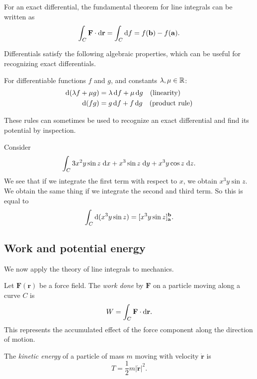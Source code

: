 \documentclass[a4paper]{article}
\begin{document}
\begin{rmk}
  For an exact differential, the fundamental theorem for line integrals can be written as
  \[
    \int_C \mathbf{F} \cdot \mathrm{d}\mathbf{r} = \int_C \mathrm{d} f = f(\mathbf{b}) - f(\mathbf{a}).
  \]
\end{rmk}

Differentials satisfy the following algebraic properties, which can be useful for recognizing exact differentials.

\begin{prop}
  For differentiable functions $f$ and $g$, and constants $\lambda, \mu \in \mathbb{R}$:
  \begin{align*}
    \mathrm{d}(\lambda f + \mu g) &= \lambda \, \mathrm{d} f + \mu \, \mathrm{d} g \quad \text{(linearity)}\\
    \mathrm{d}(fg) &= g \, \mathrm{d} f + f \, \mathrm{d} g \quad \text{(product rule)}
  \end{align*}
\end{prop}

These rules can sometimes be used to recognize an exact differential and find its potential by inspection.

\begin{eg}
  Consider
  \[
    \int_C 3x^2 y\sin z\;\mathrm{d} x + x^3 \sin z \;\mathrm{d} y + x^3 y\cos z\;\mathrm{d} z.
  \]
  We see that if we integrate the first term with respect to $x$, we obtain $x^3 y\sin z$. We obtain the same thing if we integrate the second and third term. So this is equal to
  \[
    \int_C \mathrm{d} (x^3 y \sin z) = [x^3 y\sin z]^{\mathbf{b}}_{\mathbf{a}}.
  \]
\end{eg}

\subsection{Work and potential energy}
We now apply the theory of line integrals to mechanics.

\begin{defi}[Work]
  Let $\mathbf{F}(\mathbf{r})$ be a force field. The \emph{work done} by $\mathbf{F}$ on a particle moving along a curve $C$ is
  \[
    W = \int_C \mathbf{F} \cdot \mathrm{d}\mathbf{r}.
  \]
  This represents the accumulated effect of the force component along the direction of motion.
\end{defi}

\begin{defi}
  The \emph{kinetic energy} of a particle of mass $m$ moving with velocity $\dot{\mathbf{r}}$ is
  \[
    T = \frac{1}{2} m |\dot{\mathbf{r}}|^2.
  \]
\end{defi}
\end{document}
